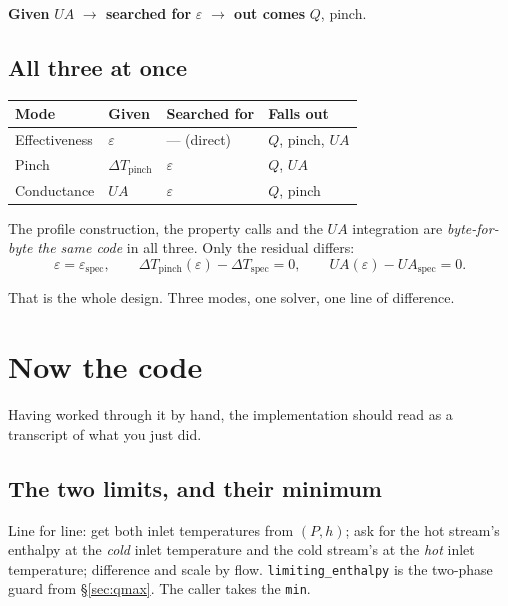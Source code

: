 \documentclass[11pt,a4paper]{report}
\newcommand{\code}[1]{\texttt{\small #1}}
\begin{document}
\noindent \textbf{Given} $UA$ \quad\textbf{$\to$ searched for}
$\varepsilon$ \quad\textbf{$\to$ out comes} $Q$, pinch.

\subsection{All three at once}

\begin{center}
\begin{tabular}{@{}llll@{}}
\toprule
Mode & Given & Searched for & Falls out \\
\midrule
Effectiveness & $\varepsilon$ & --- (direct) & $Q$, pinch, $UA$ \\
Pinch & $\Delta T_{\mathrm{pinch}}$ & $\varepsilon$ & $Q$, $UA$ \\
Conductance & $UA$ & $\varepsilon$ & $Q$, pinch \\
\bottomrule
\end{tabular}
\end{center}

The profile construction, the property calls and the $UA$ integration are
\emph{byte-for-byte the same code} in all three. Only the residual differs:
\[
  \varepsilon = \varepsilon_{\mathrm{spec}},
  \qquad
  \Delta T_{\mathrm{pinch}}(\varepsilon) - \Delta T_{\mathrm{spec}} = 0,
  \qquad
  UA(\varepsilon) - UA_{\mathrm{spec}} = 0.
\]

That is the whole design. Three modes, one solver, one line of difference.

\section{Now the code}

Having worked through it by hand, the implementation should read as a
transcript of what you just did.

\subsection{The two limits, and their minimum}


\noindent Line for line: get both inlet temperatures from $(P,h)$; ask for
the hot stream's enthalpy at the \emph{cold} inlet temperature and the cold
stream's at the \emph{hot} inlet temperature; difference and scale by flow.
\code{limiting\_enthalpy} is the two-phase guard from
\S\ref{sec:qmax}. The caller takes the \code{min}.
\end{document}
